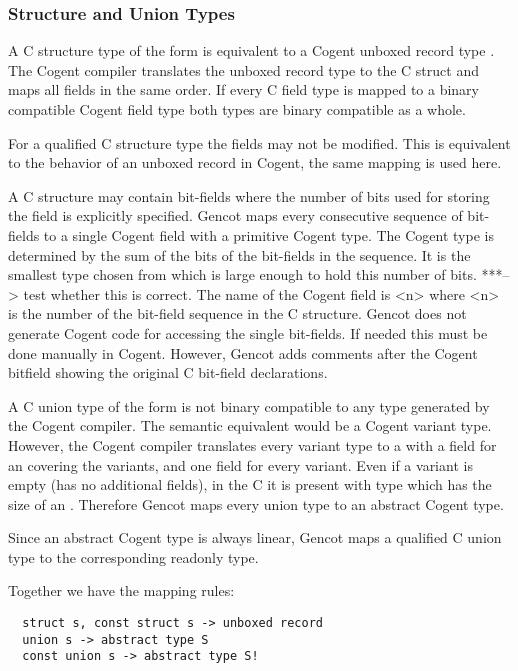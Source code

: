 \subsubsection{Structure and Union Types}
\label{design-types-struct}

A C structure type of the form  is equivalent to a Cogent unboxed record type .
The Cogent compiler translates the unboxed record type to the C struct and maps all fields in the same order.
If every C field type is mapped to a binary compatible Cogent field type both types are binary compatible as a whole.

For a  qualified C structure type the fields may not be modified. This is equivalent to the behavior
of an unboxed record in Cogent, the same mapping is used here.

A C structure may contain bit-fields where the number of bits used for storing the field is explicitly specified.
Gencot maps every consecutive sequence of bit-fields to a single Cogent field with a primitive Cogent type.
The Cogent type is determined by the sum of the bits of the bit-fields in the sequence. It is the smallest 
type chosen from  which is large enough to hold this number of bits. 
***--> test whether this is correct.
The name of the
Cogent field is <n> where <n> is the number of the bit-field sequence in the C structure.
Gencot does not generate Cogent code for accessing the single bit-fields. If needed this must be done manually in Cogent.
However, Gencot adds comments after the Cogent bitfield showing the original C bit-field declarations.

A C union type of the form  is not binary compatible to any type generated by the Cogent compiler.
The semantic equivalent would be a Cogent variant type. However, the Cogent compiler translates every variant type
to a  with a field for an  covering the variants, and one field for every variant. Even if a variant
is empty (has no additional fields), in the C  it is present with type  which
has the size of an . Therefore Gencot maps every union type to an abstract Cogent type.

Since an abstract Cogent type is always linear, Gencot maps a  qualified C union type to the corresponding
readonly type.

Together we have the mapping rules:
\begin{verbatim}
  struct s, const struct s -> unboxed record
  union s -> abstract type S
  const union s -> abstract type S!
\end{verbatim}

